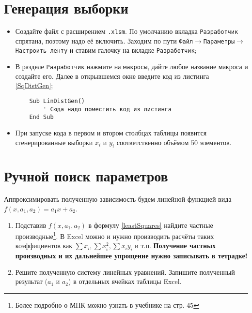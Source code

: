 \documentclass[14pt,a4paper]{article}
\begin{document}
\section{Генерация выборки}
\noindent\begin{itemize}
	\item Создайте файл с расширением \texttt{.xlsm}. По умолчанию вкладка \texttt{Разработчик} спрятана, поэтому надо её включить. Заходим по пути \texttt{Файл$\rightarrow$Параметры$\rightarrow$Настроить ленту} и ставим галочку на вкладке \texttt{Разработчик};
	\item В разделе \texttt{Разработчик} нажмите на \texttt{макросы}, дайте любое название макроса и создайте его. Далее в открывшемся окне введите код из листинга \ref{SqDistGen};
	\begin{lstlisting} 
	Sub LinDistGen()
		' Сюда надо поместить код из листинга
	End Sub  
	\end{lstlisting}
	\item При запуске кода в первом и втором столбцах таблицы появится сгенерированные выборки $x_i$ и $y_i$ соответственно объёмом 50 элементов.
\end{itemize}
\section{Ручной поиск параметров} \label{manualMethod}
Аппроксимировать полученную зависимость будем линейной функцией вида $f(x,a_1,a_2) = a_1x + a_2$.
\begin{enumerate}
    \item Подставив $f(x,a_1,a_2)$ в формулу \ref{leastSquares} найдите частные производные\footnote{Более подробно о МНК можно узнать в учебнике \cite{Stepanova2014} на стр. 45}. В Excel можно и нужно производить расчёты таких коэффициентов как $\sum x_i, \sum x_i^2, \sum x_iy_i$ и т.п. \textbf{Получение частных производных и их дальнейшее упрощение нужно записывать в тетрадке!}
    \item Решите полученную систему линейных уравнений. Запишите полученный результат ($a_1$ и $a_2$) в отдельных ячейках таблицы Excel.
\end{enumerate}
\end{document}
